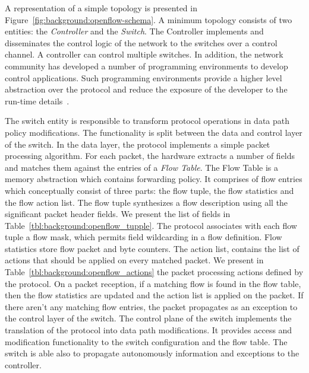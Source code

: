 A representation of a simple \of topology is presented in
Figure~\ref{fig:background:openflow-schema}. A minimum \of topology consists of
two entities: the \emph{Controller} and the \emph{Switch}. The Controller
implements and disseminates the control logic of the network to the switches
over a control channel. A controller can control multiple switches. In addition, 
the network community has developed a number of programming environments to
develop \of control applications. Such programming environments provide a 
higher level abstraction over the \of protocol and reduce the exposure of
the developer to the run-time details~\cite{nox,floodlight,nodeflow}.

The switch entity is responsible to transform \of protocol operations in data
path policy modifications. The \of functionality is split between the data and
control layer of the switch. In the data layer, the protocol implements a simple
packet processing algorithm.  For each packet, the hardware extracts a number of
fields and matches them against the entries of a \emph{Flow Table}.  The Flow
Table is a memory abstraction which contains forwarding policy. It comprises of
flow entries which conceptually consist of three parts: the flow tuple, the flow
statistics and the flow action list.  The flow tuple synthesizes a flow
description using all the significant packet header fields.  We present the list
of fields in Table~\ref{tbl:background:openflow_tupple}.  The protocol
associates with each flow tuple a flow mask, which permits field wildcarding in
a flow definition.  Flow statistics store flow packet and byte counters. The
action list, contains the list of actions that should be applied on every
matched packet.  We present in Table~\ref{tbl:background:openflow_actions} the
packet processing actions defined by the \of protocol.  On a packet reception,
if a matching flow is found in the flow table, then the flow statistics are
updated and the action list is applied on the packet. If there aren't any
matching flow entries, the packet propagates as an exception to the control
layer of the switch.  The control plane of the switch implements the translation
of the \of protocol into data path modifications.  It provides access and
modification functionality to the switch configuration and the flow table. The
switch is able also to propagate autonomously information and exceptions 
to the controller. 

